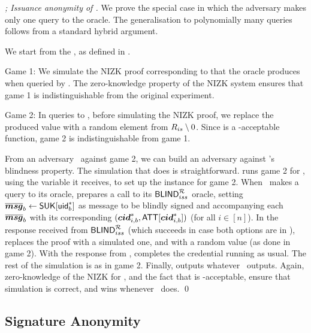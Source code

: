 \begin{proof}[; Issuance anonymity of \CUASGen]
  We prove the special case in which the adversary makes only one query to the
  \OBTCHALb oracle. The generalisation to polynomially many queries follows
  from a standard hybrid argument.

  We start from the \ExpIssAnonb, as defined in . 

  Game 1: We simulate the NIZK proof corresponding to \RelIss that
  the \OBTCHALb oracle produces when queried by \adv. The zero-knowledge
  property of the NIZK system ensures that game 1 is indistinguishable from
  the original experiment.

  Game 2: In queries to \OBTCHALb, before simulating the NIZK proof, we replace
  the produced \yissue value with a random element from $R_{is} \setminus
  0$. Since \fissue is a \UAS-acceptable function, game 2 is indistinguishable
  from game 1.

  From an adversary \adv~against game 2, we can build an adversary \advB against
  \SBCM's blindness property. The simulation that \advB does is straightforward.
  \advB runs game 2 for \adv, using the \SBCM \parm variable it receives, to
  set up the \SBCM instance for game 2. When \adv~makes a query to its \OBTCHALb
  oracle, \advB prepares a call to its $\mathsf{BLIND}^\mathcal{R}_{iss}$ oracle, setting
  $\overline{\boldsymbol{msg}}_b \gets \mathsf{S}\mathsf{UK}[\mathsf{uid}^*_b]$ as message to be blindly signed and
  accompanying each $\overline{\boldsymbol{msg}}_b$ with its corresponding
  $(\boldsymbol{cid}^*_{i,b},\mathsf{ATT}[\boldsymbol{cid}^*_{i,b}])$ (for all $i\in[n]$). In the response
  received from $\mathsf{BLIND}^\mathcal{R}_{iss}$ (which succeeds in case both options
  are in \RelIss), \advB replaces the proof with a simulated one, and \yissue
  with a random value (as done in game 2). With the response from \adv, \advB
  completes the credential running \SBCMUnblind as usual. The rest of the
  simulation is as in game 2. Finally, \advB outputs whatever \adv~outputs.
  Again, zero-knowledge of the NIZK for \RelIss, and the fact that \fissue is
  \UAS-acceptable, ensure that simulation is correct, and \advB wins whenever
  \adv~does.
  \qed
\end{proof}

\subsection{Signature Anonymity}

